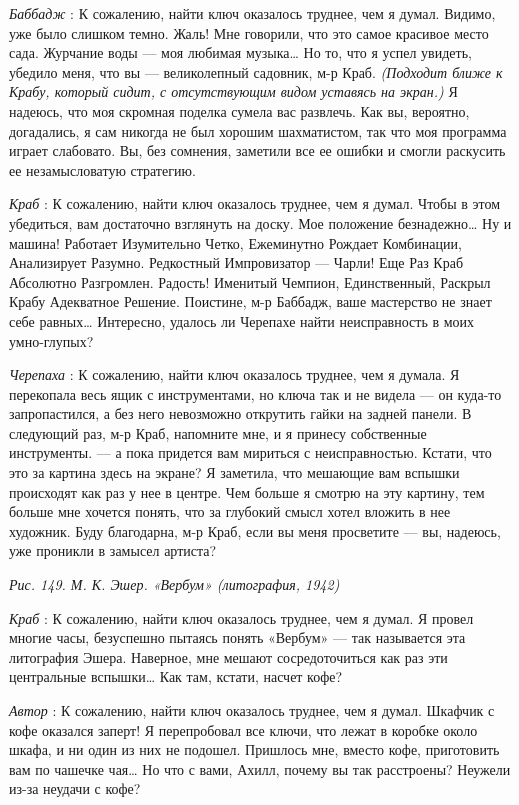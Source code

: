 \emph{Баббадж} : К сожалению, найти ключ оказалось труднее, чем я думал. Видимо, уже было слишком темно. Жаль! Мне говорили, что это самое красивое место сада. Журчание воды --- моя любимая музыка\ldots{} Но то, что я успел увидеть, убедило меня, что вы --- великолепный садовник, м-р Краб. \emph{(Подходит ближе к Крабу, который сидит, с отсутствующим видом уставясь на экран.)} Я надеюсь, что моя скромная поделка сумела вас развлечь. Как вы, вероятно, догадались, я сам никогда не был хорошим шахматистом, так что моя программа играет слабовато. Вы, без сомнения, заметили все ее ошибки и смогли раскусить ее незамысловатую стратегию.

\emph{Краб} : К сожалению, найти ключ оказалось труднее, чем я думал. Чтобы в этом убедиться, вам достаточно взглянуть на доску. Мое положение безнадежно\ldots{} Ну и машина! Работает Изумительно Четко, Ежеминутно Рождает Комбинации, Анализирует Разумно. Редкостный Импровизатор --- Чарли! Еще Раз Краб Абсолютно Разгромлен. Радость! Именитый Чемпион, Единственный, Раскрыл Крабу Адекватное Решение. Поистине, м-р Баббадж, ваше мастерство не знает себе равных\ldots{} Интересно, удалось ли Черепахе найти неисправность в моих умно-глупых?

\emph{Черепаха} : К сожалению, найти ключ оказалось труднее, чем я думала. Я перекопала весь ящик с инструментами, но ключа так и не видела --- он куда-то запропастился, а без него невозможно открутить гайки на задней панели. В следующий раз, м-р Краб, напомните мне, и я принесу собственные инструменты. --- а пока придется вам мириться с неисправностью. Кстати, что это за картина здесь на экране? Я заметила, что мешающие вам вспышки происходят как раз у нее в центре. Чем больше я смотрю на эту картину, тем больше мне хочется понять, что за глубокий смысл хотел вложить в нее художник. Буду благодарна, м-р Краб, если вы меня просветите --- вы, надеюсь, уже проникли в замысел артиста?

\emph{Рис. 149. М. К. Эшер. «Вербум» (литография, 1942)}

\emph{Краб} : К сожалению, найти ключ оказалось труднее, чем я думал. Я провел многие часы, безуспешно пытаясь понять «Вербум» --- так называется эта литография Эшера. Наверное, мне мешают сосредоточиться как раз эти центральные вспышки\ldots{} Как там, кстати, насчет кофе?

\emph{Автор} : К сожалению, найти ключ оказалось труднее, чем я думал. Шкафчик с кофе оказался заперт! Я перепробовал все ключи, что лежат в коробке около шкафа, и ни один из них не подошел. Пришлось мне, вместо кофе, приготовить вам по чашечке чая\ldots{} Но что с вами, Ахилл, почему вы так расстроены? Неужели из-за неудачи с кофе?

